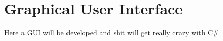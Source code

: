 \section{Graphical User Interface} \label{sec:user_interface}

Here a GUI will be developed and shit will get really crazy with C\#

%
%
%
%
%
%
